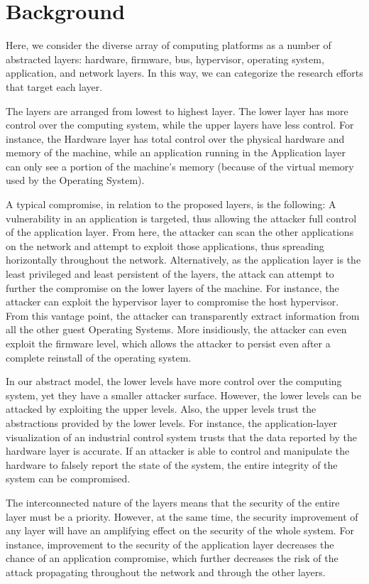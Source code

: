 \documentclass[11pt,letterpaper]{article}
\begin{document}
\section{Background}

Here, we consider the diverse array of computing platforms as a number
of abstracted layers: hardware, firmware, bus, hypervisor, operating
system, application, and network layers. In this way, we can
categorize the research efforts that target each layer.

The layers are arranged from lowest to highest layer. The lower layer
has more control over the computing system, while the upper layers
have less control. For instance, the Hardware layer has total control
over the physical hardware and memory of the machine, while an
application running in the Application layer can only see a portion of
the machine's memory (because of the virtual memory used by the
Operating System).

A typical compromise, in relation to the proposed layers, is the
following: A vulnerability in an application is targeted, thus
allowing the attacker full control of the application layer. From
here, the attacker can scan the other applications on the network and
attempt to exploit those applications, thus spreading horizontally
throughout the network. Alternatively, as the application layer is the
least privileged and least persistent of the layers, the attack can
attempt to further the compromise on the lower layers of the machine.
For instance, the attacker can exploit the hypervisor layer to
compromise the host hypervisor. From this vantage point, the attacker
can transparently extract information from all the other guest
Operating Systems. More insidiously, the attacker can even exploit the
firmware level, which allows the attacker to persist even after
a complete reinstall of the operating system.

In our abstract model, the lower levels have more control over the
computing system, yet they have a smaller attacker surface. However,
the lower levels can be attacked by exploiting the upper levels. Also, the upper
levels trust the abstractions provided by the lower levels. For
instance, the application-layer visualization of an industrial control
system trusts that the data reported by the hardware layer is
accurate. If an attacker is able to control and manipulate the
hardware to falsely report the state of the system, the entire
integrity of the system can be compromised.

The interconnected nature of the layers means that the security of the
entire layer must be a priority. However, at the same time, the
security improvement of any layer will have an amplifying effect on
the security of the whole system. For instance, improvement to the
security of the application layer decreases the chance of an
application compromise, which further decreases the risk of the attack
propagating throughout the network and through the other layers.
\end{document}
